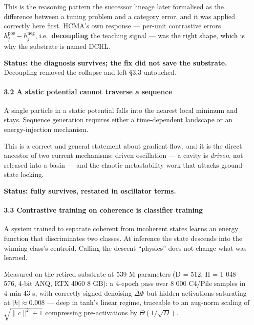 \documentclass[
  11pt,
  a4paper,
]{article}
\begin{document}
This is the reasoning pattern the successor lineage later formalised as
the difference between a tuning problem and a category error, and it was
applied correctly here first. HCMA's own response --- per-unit
contrastive errors \(h^{\text{pos}}_j - h^{\text{neg}}_j\),
i.e.~\textbf{decoupling} the teaching signal --- was the right shape,
which is why the substrate is named DCHL.

\textbf{Status: the diagnosis survives; the fix did not save the
substrate.} Decoupling removed the collapse and left §3.3 untouched.

\paragraph{3.2 A static potential cannot traverse a
sequence}\label{a-static-potential-cannot-traverse-a-sequence}

A single particle in a static potential falls into the nearest local
minimum and stays. Sequence generation requires either a time-dependent
landscape or an energy-injection mechanism.

This is a correct and general statement about gradient flow, and it is
the direct ancestor of two current mechanisms: driven oscillation --- a
cavity is \emph{driven}, not released into a basin --- and the chaotic
metastability work that attacks ground-state locking.

\textbf{Status: fully survives, restated in oscillator terms.}

\paragraph{3.3 Contrastive training on coherence is classifier
training}\label{contrastive-training-on-coherence-is-classifier-training}

A system trained to separate coherent from incoherent states learns an
energy function that discriminates two classes. At inference the state
descends into the winning class's centroid. Calling the descent
``physics'' does not change what was learned.

Measured on the retired substrate at 539 M parameters (D = 512, H = 1
048 576, 4-bit ANQ, RTX 4060 8 GB): a 4-epoch pass over 8 000 C4/Pile
samples in 4 min 43 s, with correctly-signed denoising \(\Delta\Phi\)
but hidden activations saturating at \(|h| \approx 0.008\) --- deep in
tanh's linear regime, traceable to an aug-norm scaling of
\(\sqrt{\lVert c \rVert^2 + 1}\) compressing pre-activations by
\(\Theta(1/\sqrt{D})\).
\end{document}
